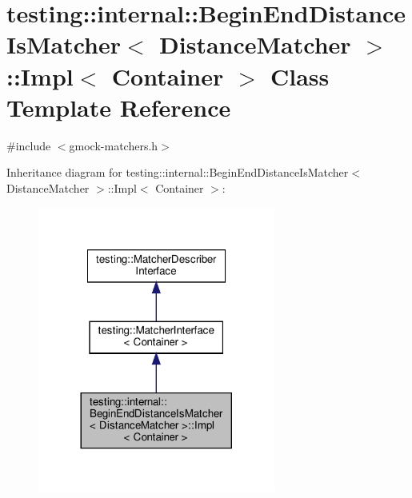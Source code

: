 \hypertarget{classtesting_1_1internal_1_1_begin_end_distance_is_matcher_1_1_impl}{}\section{testing\+:\+:internal\+:\+:Begin\+End\+Distance\+Is\+Matcher$<$ Distance\+Matcher $>$\+:\+:Impl$<$ Container $>$ Class Template Reference}
\label{classtesting_1_1internal_1_1_begin_end_distance_is_matcher_1_1_impl}


{\ttfamily \#include $<$gmock-\/matchers.\+h$>$}



Inheritance diagram for testing\+:\+:internal\+:\+:Begin\+End\+Distance\+Is\+Matcher$<$ Distance\+Matcher $>$\+:\+:Impl$<$ Container $>$\+:
\nopagebreak
\begin{figure}[H]
\begin{center}
\leavevmode
\includegraphics[width=221pt]{classtesting_1_1internal_1_1_begin_end_distance_is_matcher_1_1_impl__inherit__graph}
\end{center}
\end{figure}


